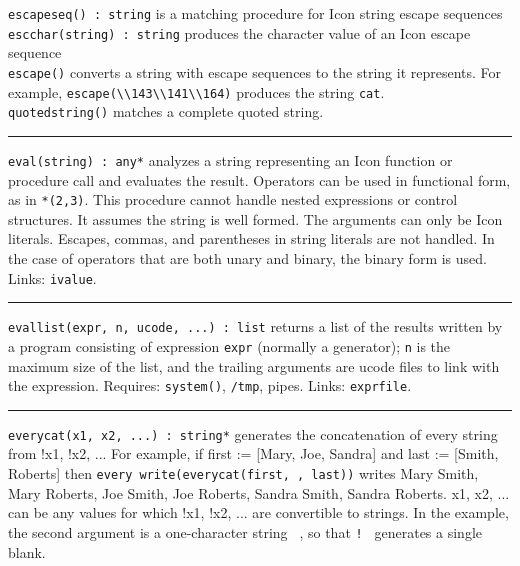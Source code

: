 \texttt{escapeseq() : string} is a matching procedure for Icon string
escape sequences\\
\texttt{escchar(string) : string} produces the character value of an
Icon escape sequence\\
\texttt{escape()} converts a string with escape sequences to the string it
represents. For example,
\texttt{escape({\textquotedbl}{\textbackslash}{\textbackslash}143{\textbackslash}{\textbackslash}141{\textbackslash}{\textbackslash}164{\textquotedbl})}
produces the string \texttt{{\textquotedbl}cat{\textquotedbl}}.\\
\texttt{quotedstring()} matches a complete quoted string.

\vspace{0.25cm}\hrule{}

\texttt{eval(string) : any*} analyzes a string
representing an Icon function or procedure call and evaluates the
result. Operators can be used in functional form, as in
\texttt{{\textquotedbl}*(2,3){\textquotedbl}}. This procedure cannot
handle nested expressions or control structures. It assumes the string
is well formed. The arguments can only be Icon literals. Escapes,
commas, and parentheses in string literals are not handled. In the case
of operators that are both unary and binary, the binary form is used.
Links: \texttt{ivalue}. 

\vspace{0.25cm}\hrule{}

\texttt{evallist(expr, n, ucode, ...) : list} 
returns a list of the results written by a program consisting of expression
\texttt{expr} (normally a
generator); \texttt{n} is the maximum size of the list, and the
trailing arguments are ucode files to link with the expression.
Requires: \texttt{system()}, \texttt{/tmp}, pipes. Links:
\texttt{exprfile}. 

\vspace{0.25cm}\hrule{}

\texttt{everycat(x1, x2, ...) : string*} generates the concatenation of
every string from !x1, !x2, ... For example, if first :=
[{\textquotedbl}Mary{\textquotedbl}, {\textquotedbl}Joe{\textquotedbl},
{\textquotedbl}Sandra{\textquotedbl}] and last :=
[{\textquotedbl}Smith{\textquotedbl},
{\textquotedbl}Roberts{\textquotedbl}] then \texttt{every
write(everycat(first, {\textquotedbl} {\textquotedbl}, last))} writes
Mary Smith, Mary Roberts, Joe Smith, Joe Roberts, Sandra Smith, Sandra
Roberts. x1, x2, ... can be any values for which !x1, !x2, ... are
convertible to strings. In the example, the second
argument is a one-character string \texttt{{\textquotedbl}
{\textquotedbl}}, so that \texttt{!{\textquotedbl} {\textquotedbl}}
generates a single blank. 

